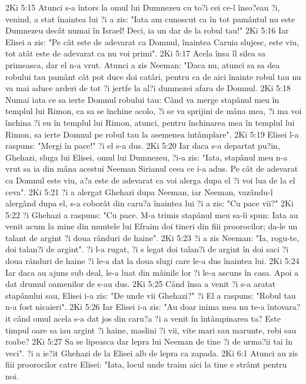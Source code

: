 2Ki 5:15  Atunci s-a întors la omul lui Dumnezeu cu to?i cei ce-l înso?eau ?i, venind, a stat înaintea lui ?i a zis: "Iata am cunoscut ca în tot pamântul nu este Dumnezeu decât numai în Israel! Deci, ia un dar de la robul tau!"
2Ki 5:16  Iar Elisei a zis: "Pe cât este de adevarat ca Domnul, înaintea Caruia slujesc, este viu, tot atât este de adevarat ca nu voi primi".
2Ki 5:17  Acela însa îl silea sa primeasca, dar el n-a vrut. Atunci a zis Neeman: "Daca nu, atunci sa sa dea robului tau pamânt cât pot duce doi catâri, pentru ca de aici înainte robul tau nu va mai aduce arderi de tot ?i jertfe la al?i dumnezei afara de Domnul.
2Ki 5:18  Numai iata ce sa ierte Domnul robului tau: Când va merge stapânul meu în templul lui Rimon, ca sa se închine acolo, ?i se va sprijini de mâna mea, ?i ma voi închina ?i eu în templul lui Rimon, atunci, pentru închinarea mea în templul lui Rimon, sa ierte Domnul pe robul tau la asemenea întâmplare".
2Ki 5:19  Elisei l-a raspuns: "Mergi în pace!" ?i el s-a dus.
2Ki 5:20  Iar daca s-a departat pu?in, Ghehazi, sluga lui Elisei, omul lui Dumnezeu, ?i-a zis: "Iata, stapânul meu n-a vrut sa ia din mâna acestui Neeman Sirianul ceea ce i-a adus. Pe cât de adevarat ca Domnul este viu, a?a este de adevarat ca voi alerga dupa el ?i voi lua de la el ceva".
2Ki 5:21  ?i a alergat Ghehazi dupa Neeman, iar Neeman, vazându-l alergând dupa el, s-a coborât din caru?a înaintea lui ?i a zis: "Cu pace vii?"
2Ki 5:22  ?i Ghehazi a raspuns: "Cu pace. M-a trimis stapânul meu sa-îi spun: Iata au venit acum la mine din muntele lui Efraim doi tineri din fiii proorocilor; da-le un talant de argint ?i doua rânduri de haine".
2Ki 5:23  ?i a zis Neeman: "Ia, rogu-te, doi talan?i de argint". ?i l-a rugat, ?i s legat doi talan?i de argint în doi saci ?i doua rânduri de haine ?i le-a dat la doua slugi care le-a dus înaintea lui.
2Ki 5:24  Iar daca au ajuns sub deal, le-a luat din mâinile lor ?i le-a ascuns în casa. Apoi a dat drumul oamenilor de s-au dus.
2Ki 5:25  Când însa a venit ?i s-a aratat stapânului sau, Elisei i-a zis: "De unde vii Ghehazi?" ?i El a raspuns: "Robul tau n-a fost nicaieri".
2Ki 5:26  Iar Elisei i-a zis: "Au doar inima mea nu te-a întovara?it când omul acela s-a dat jos din caru?a ?i a venit în întâmpinarea ta? Este timpul oare sa iau argint ?i haine, maslini ?i vii, vite mari sau marunte, robi sau roabe?
2Ki 5:27  Sa se lipeasca dar lepra lui Neeman de tine ?i de urma?ii tai în veci". ?i a ie?it Ghehazi de la Elisei alb de lepra ca zapada.
2Ki 6:1  Atunci au zis fiii proorocilor catre Elisei: "Iata, locul unde traim aici la tine e strâmt pentru noi.
